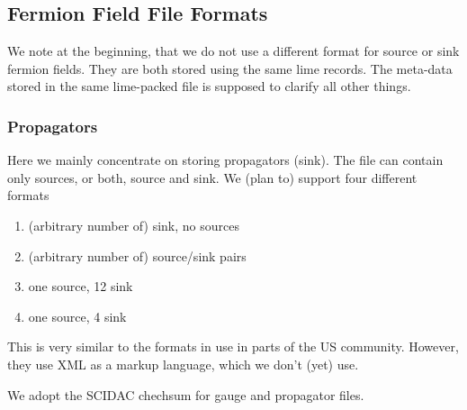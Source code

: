 \subsection{Fermion Field File Formats}

We note at the beginning, that we do not use a different format for
source or sink fermion fields. They are both stored using the same
lime records. The meta-data stored in the same lime-packed file is
supposed to clarify all other things.

\subsubsection{Propagators}

Here we mainly concentrate on storing propagators (sink). The file can
contain only sources, or both, source and sink. We (plan to) support
four different formats
\begin{enumerate}
\item (arbitrary number of) sink, no sources
\item (arbitrary number of) source/sink pairs
\item one source, 12 sink
\item one source, 4 sink
\end{enumerate}
This is very similar to the formats in use in parts of the US
community. However, they use XML as a markup language, which we don't
(yet) use.

We adopt the SCIDAC chechsum for gauge and propagator files.


